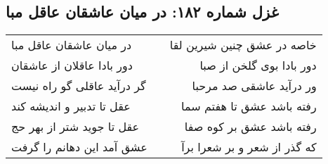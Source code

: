 \begin{center}
\section*{غزل شماره ۱۸۲: در میان عاشقان عاقل مبا}
\label{sec:0182}
\begin{longtable}{l p{0.5cm} r}
در میان عاشقان عاقل مبا
&&
خاصه در عشق چنین شیرین لقا
\\
دور بادا عاقلان از عاشقان
&&
دور بادا بوی گلخن از صبا
\\
گر درآید عاقلی گو راه نیست
&&
ور درآید عاشقی صد مرحبا
\\
عقل تا تدبیر و اندیشه کند
&&
رفته باشد عشق تا هفتم سما
\\
عقل تا جوید شتر از بهر حج
&&
رفته باشد عشق بر کوه صفا
\\
عشق آمد این دهانم را گرفت
&&
که گذر از شعر و بر شعرا برآ
\\
\end{longtable}
\end{center}
